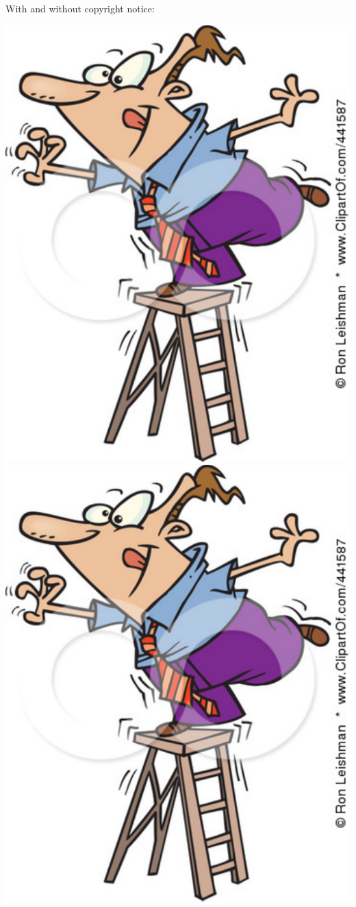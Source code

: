\documentclass[11pt]{article}
\begin{document}
\bigskip 

With and without copyright notice:

\hfill\includegraphics[scale=.4]{ladder1.pdf}\hfill
\includegraphics[trim = 0mm 0mm 5mm 0mm, clip, scale=.4]{ladder1.pdf}\hfill\mbox{}
\end{document}

